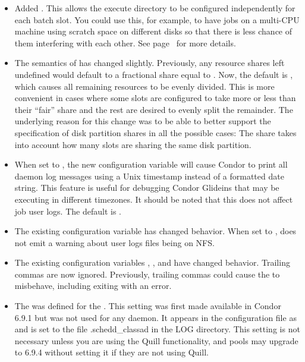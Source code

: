 \begin{itemize}

\item Added .  This allows the execute directory
to be configured independently for each batch slot.  You could use this,
for example, to have jobs on a multi-CPU machine using scratch space on
different disks so that there is less chance of them interfering with
each other.  See page~\pageref{param:SlotXExecute} for more details.

\item The semantics of  has changed slightly.
Previously, any resource shares left undefined would default to a fractional
share equal to .  Now, the default is , which
causes all remaining resources to be evenly divided.  This is more convenient
in cases where some slots are configured to take more or less than their
``fair'' share and the rest are desired to evenly split the remainder.
The underlying reason for this change was to be able to better support
the specification of disk partition shares in all the possible cases:
The  share takes into account how many slots are sharing the
same disk partition.

\item When set to , the new configuration variable
 will cause Condor to print all daemon
log messages using a Unix timestamp instead of a formatted date
string. This feature is useful for debugging Condor Glideins that may
be executing in different timezones. It should be noted that this does
not affect job user logs. The default is .

\item The existing configuration variable  has 
changed behavior. When set to ,
 does not emit a warning about user logs files being on NFS.

\item The existing 
configuration variables ,
, and  
have changed behavior.
Trailing commas are now ignored.
Previously, trailing commas could cause the  to misbehave,
including exiting with an error.

\item The  was defined for the .
This setting was first made available in Condor 6.9.1 but was not used for
any daemon.  
It appears in the configuration file as  and
is set to the file .schedd\_classad in the LOG directory. This setting is 
not necessary unless you are using the Quill functionality, and pools may 
upgrade to 6.9.4 without setting it if they are not using Quill. 
  

\end{itemize}
